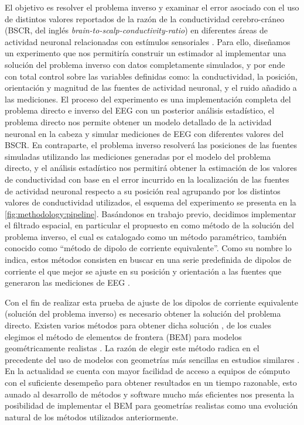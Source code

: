El objetivo es resolver el problema inverso y examinar el error asociado con el uso de distintos valores reportados de la razón de la conductividad cerebro-cráneo (BSCR, del inglés \emph{brain-to-scalp-conductivity-ratio}) en diferentes áreas de actividad neuronal relacionadas con estímulos sensoriales \cite{McCann2019}.
Para ello, diseñamos un experimento que nos permitiría construir un estimador al implementar una solución del problema inverso con datos completamente simulados, y por ende con total control sobre las variables definidas como: la conductividad, la posición, orientación y magnitud de las fuentes de actividad neuronal, y el ruido añadido a las mediciones.
El proceso del experimento es una implementación completa del problema directo e inverso del EEG con un posterior análisis estadístico, el problema directo nos permite obtener un modelo detallado de la actividad neuronal en la cabeza y simular mediciones de EEG con diferentes valores del BSCR.
En contraparte, el problema inverso resolverá las posiciones de las fuentes simuladas utilizando las mediciones generadas por el modelo del problema directo, y el análisis estadístico nos permitirá obtener la estimación de los valores de conductividad con base en el error incurrido en la localización de las fuentes de actividad neuronal respecto a su posición real agrupando por los distintos valores de conductividad utilizados, el esquema del experimento se presenta en la \cref{fig:methodology:pipeline}.
Basándonos en trabajo previo, decidimos implementar el filtrado espacial, en particular el propuesto en \cite{VanVeen1988} como método de la solución del problema inverso, el cual es catalogado como un método paramétrico, también conocido como ``método de dipolo de corriente equivalente''.
Como su nombre lo indica, estos métodos consisten en buscar en una serie predefinida de dipolos de corriente el que mejor se ajuste en su posición y orientación a las fuentes que generaron las mediciones de EEG  \cite{Hallez2007}.

Con el fin de realizar esta prueba de ajuste de los dipolos de corriente equivalente (solución del problema inverso) es necesario obtener la solución del problema directo. Existen varios métodos para obtener dicha solución \cite{Mosher1999}, de los cuales elegimos el método de elementos de frontera (BEM) para modelos geométricamente realistas \cite{Ermer2001}.
La razón de elegir este método radica en el precedente del uso de modelos con geometrías más sencillas en estudios similares \cite{Gutierrez2004}.
En la actualidad se cuenta con mayor facilidad de acceso a equipos de cómputo con el suficiente desempeño para obtener resultados en un tiempo razonable, esto aunado al desarrollo de métodos y software mucho más eficientes \cite{open,Clerc2010} nos presenta la posibilidad de implementar el BEM para geometrías realistas como una evolución natural de los métodos utilizados anteriormente.

